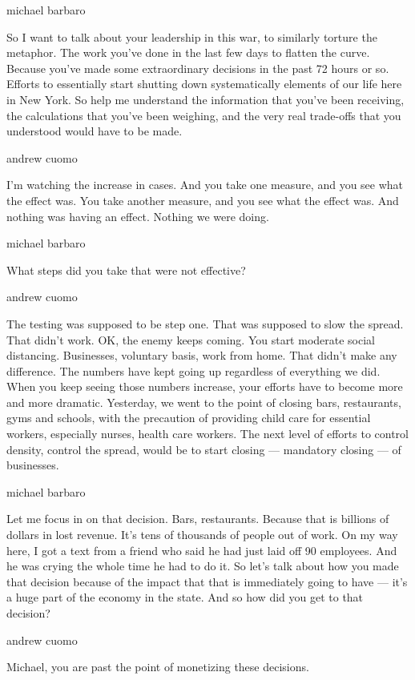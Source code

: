 michael barbaro

So I want to talk about your leadership in this war, to similarly
torture the metaphor. The work you've done in the last few days to
flatten the curve. Because you've made some extraordinary decisions in
the past 72 hours or so. Efforts to essentially start shutting down
systematically elements of our life here in New York. So help me
understand the information that you've been receiving, the calculations
that you've been weighing, and the very real trade-offs that you
understood would have to be made.

andrew cuomo

I'm watching the increase in cases. And you take one measure, and you
see what the effect was. You take another measure, and you see what the
effect was. And nothing was having an effect. Nothing we were doing.

michael barbaro

What steps did you take that were not effective?

andrew cuomo

The testing was supposed to be step one. That was supposed to slow the
spread. That didn't work. OK, the enemy keeps coming. You start moderate
social distancing. Businesses, voluntary basis, work from home. That
didn't make any difference. The numbers have kept going up regardless of
everything we did. When you keep seeing those numbers increase, your
efforts have to become more and more dramatic. Yesterday, we went to the
point of closing bars, restaurants, gyms and schools, with the
precaution of providing child care for essential workers, especially
nurses, health care workers. The next level of efforts to control
density, control the spread, would be to start closing --- mandatory
closing --- of businesses.

michael barbaro

Let me focus in on that decision. Bars, restaurants. Because that is
billions of dollars in lost revenue. It's tens of thousands of people
out of work. On my way here, I got a text from a friend who said he had
just laid off 90 employees. And he was crying the whole time he had to
do it. So let's talk about how you made that decision because of the
impact that that is immediately going to have --- it's a huge part of
the economy in the state. And so how did you get to that decision?

andrew cuomo

Michael, you are past the point of monetizing these decisions.

